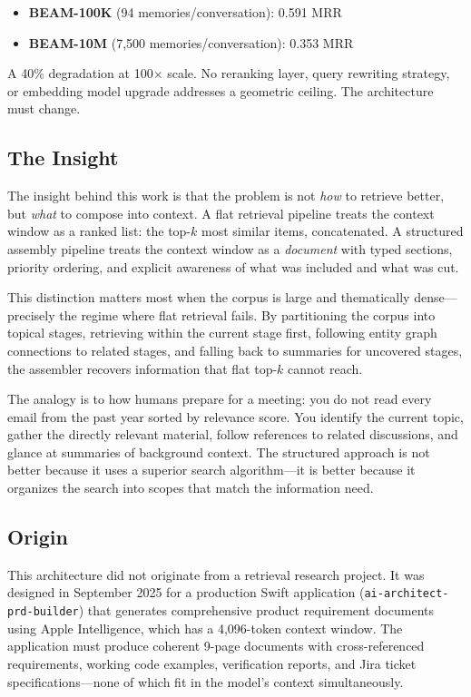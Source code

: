 \documentclass[11pt]{article}
\begin{document}
\begin{itemize}
  \item \textbf{BEAM-100K} (94 memories/conversation): 0.591 MRR
  \item \textbf{BEAM-10M} (7,500 memories/conversation): 0.353 MRR
\end{itemize}

A 40\% degradation at 100$\times$ scale.  No reranking layer, query
rewriting strategy, or embedding model upgrade addresses a geometric
ceiling.  The architecture must change.

\subsection{The Insight}
\label{sec:insight}

The insight behind this work is that the problem is not \emph{how} to
retrieve better, but \emph{what} to compose into context.  A flat
retrieval pipeline treats the context window as a ranked list: the
top-$k$ most similar items, concatenated.  A structured assembly
pipeline treats the context window as a \emph{document} with typed
sections, priority ordering, and explicit awareness of what was
included and what was cut.

This distinction matters most when the corpus is large and
thematically dense---precisely the regime where flat retrieval fails.
By partitioning the corpus into topical stages, retrieving within the
current stage first, following entity graph connections to related
stages, and falling back to summaries for uncovered stages, the
assembler recovers information that flat top-$k$ cannot reach.

The analogy is to how humans prepare for a meeting: you do not read
every email from the past year sorted by relevance score.  You
identify the current topic, gather the directly relevant material,
follow references to related discussions, and glance at summaries of
background context.  The structured approach is not better because
it uses a superior search algorithm---it is better because it
organizes the search into scopes that match the information need.

\subsection{Origin}
\label{sec:origin}

This architecture did not originate from a retrieval research project.
It was designed in September 2025 for a production Swift application
(\texttt{ai-architect-prd-builder}) that generates comprehensive
product requirement documents using Apple Intelligence, which has a
4,096-token context window.  The application must produce coherent
9-page documents with cross-referenced requirements, working code
examples, verification reports, and Jira ticket specifications---none
of which fit in the model's context simultaneously.
\end{document}
